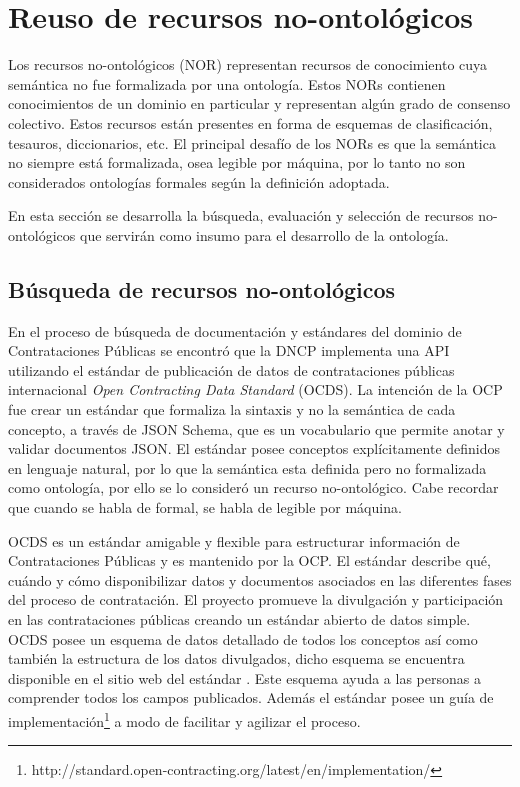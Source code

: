 
\section{Reuso de recursos no-ontológicos}
Los recursos no-ontológicos (NOR)\cite{ReusoRecursoNoOntologico} representan recursos de conocimiento cuya semántica no fue formalizada por una ontología. Estos NORs contienen conocimientos de un dominio en particular y representan algún grado de consenso colectivo. Estos recursos están presentes en forma de esquemas de clasificación, tesauros, diccionarios, etc. El principal desafío de los NORs es que la semántica no siempre está formalizada, osea legible por máquina, por lo tanto no son considerados ontologías formales según la definición adoptada.

En esta sección se desarrolla la búsqueda, evaluación y selección de recursos no-ontológicos que servirán como insumo para el desarrollo de la ontología.

\subsection{Búsqueda de recursos no-ontológicos }

En el proceso de búsqueda de documentación y estándares del dominio de Contrataciones Públicas se encontró que la DNCP implementa una API utilizando el estándar de publicación de datos de contrataciones públicas internacional \textit{Open Contracting Data Standard} (OCDS). La intención de la OCP fue crear un estándar que formaliza la sintaxis y no la semántica de cada concepto, a través de JSON Schema\cite{JSONSche10:online}, que es un vocabulario que permite anotar y validar documentos JSON. El estándar posee conceptos explícitamente definidos en lenguaje natural, por lo que la semántica esta definida pero no formalizada como ontología, por ello se lo consideró un recurso no-ontológico. Cabe recordar que cuando se habla de formal, se habla de legible por máquina. 

OCDS es un estándar amigable y flexible para estructurar información de Contrataciones Públicas y es mantenido por la OCP. El estándar describe qué, cuándo y cómo disponibilizar datos y documentos asociados en las diferentes fases del proceso de contratación. El proyecto promueve la divulgación y participación en las contrataciones públicas creando un estándar abierto de datos simple. OCDS posee un esquema de datos detallado de todos los conceptos así como también la estructura de los datos divulgados, dicho esquema se encuentra disponible en el sitio web del estándar \cite{OCDSReleaseSchema:online}. Este esquema ayuda a las personas a comprender todos los campos publicados. Además el estándar posee un guía de implementación\footnote{http://standard.open-contracting.org/latest/en/implementation/} a modo de facilitar y agilizar el proceso.

